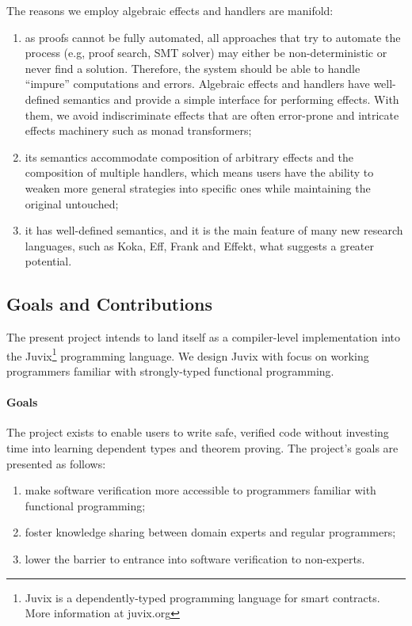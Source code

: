 \documentclass[sigconfl]{acmart}
\begin{document}
The reasons we employ algebraic effects and handlers are manifold:
\begin{enumerate}
\item as proofs cannot be fully automated, all approaches that try to automate
  the process (e.g, proof search, SMT solver) may either be non-deterministic or
  never find a solution. Therefore, the system should be able to handle
  ``impure'' computations and errors. Algebraic effects and handlers have
  well-defined semantics and provide a simple interface for performing effects.
  With them, we avoid indiscriminate effects that are often error-prone and
  intricate effects machinery such as monad transformers;
\item its semantics accommodate composition of arbitrary effects and the
  composition of multiple handlers, which means users have the ability to weaken
  more general strategies into specific ones while maintaining the original untouched;
\item it has well-defined semantics, and it is the main feature of many new
  research languages, such as Koka, Eff, Frank and Effekt, what suggests a greater
  potential.
\end{enumerate}

\subsection{Goals and Contributions}

The present project intends to land itself as a compiler-level implementation into the
Juvix\footnote{Juvix is a dependently-typed programming language for smart
  contracts. More information at juvix.org} programming language. We design
Juvix with focus on working programmers familiar with strongly-typed functional
programming.

\paragraph{Goals} The project exists to enable users to write safe, verified
code without investing time into learning dependent types and theorem proving.
The project's goals are presented as follows:
\begin{enumerate}
\item make software verification more accessible to programmers familiar with
  functional programming;
\item foster knowledge sharing between domain experts and regular programmers;
\item lower the barrier to entrance into software verification to non-experts.
\end{enumerate}
\end{document}

